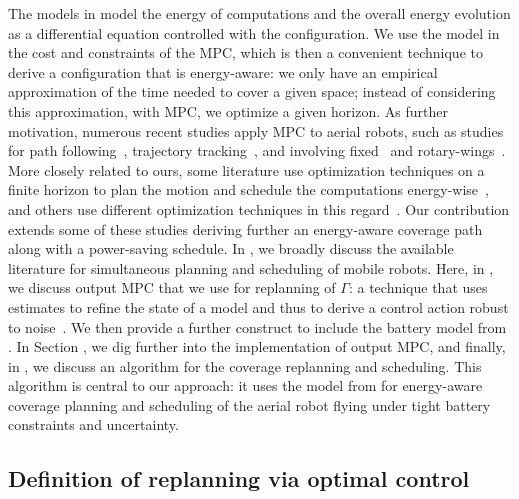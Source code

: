 The models in  model the energy of computations and the overall energy evolution as a differential equation controlled with the configuration. We use the model in the cost and constraints of the MPC, which is then a convenient technique to derive a configuration that is energy-aware: we only have an empirical approximation of the time needed to cover a given space; instead of considering this approximation, with MPC, we optimize a given horizon. As further motivation, numerous recent studies apply MPC to aerial robots, such as studies for path following~\citep{gavilan2015iterative}, trajectory tracking~\citep{torrente2021data}, and involving fixed~\citep{kang2009linear,stastny2018nonlinear,chao2011collision,cavanini2021model} and rotary-wings~\citep{kostadinov2020online,song2020learning,bicego2020nonlinear}. More closely related to ours, some literature use optimization techniques on a finite horizon to plan the motion and schedule the computations energy-wise~\citep{zhang2007low,ondruska2015scheduled}, and others use different optimization techniques in this regard~\citep{lahijanian2018resource,brateman2006energy}. Our contribution extends some of these studies deriving further an energy-aware coverage path along with a power-saving schedule. In , we broadly discuss the available literature for simultaneous planning and scheduling of mobile robots. Here, in , we discuss output MPC that we use for replanning of $\Gamma$: a technique that uses estimates to refine the state of a model and thus to derive a control action robust to noise~\citep{rawlings2017model}. We then provide a further construct to include the battery model from . In Section , we dig further into the implementation of output MPC, and finally, in , we discuss an algorithm for the coverage replanning and scheduling. This algorithm is central to our approach: it uses the model from  for energy-aware coverage planning and scheduling of the aerial robot flying under tight battery constraints and uncertainty.

\subsection{Definition of replanning via optimal control}
\label{sec:output-mpc}

